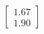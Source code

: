 \documentclass[preview]{standalone}
\begin{document}
\begin{align*}
\begin{bmatrix} 1.67 \\ 1.90 \end{bmatrix}
\end{align*}
\end{document}
